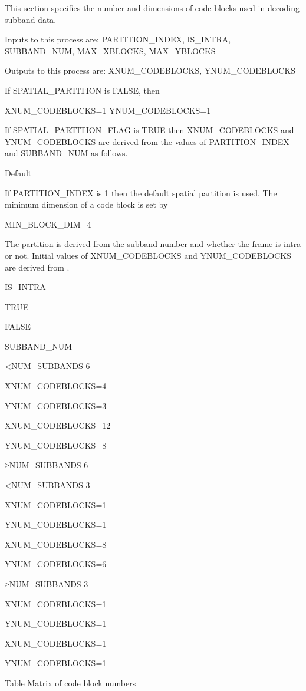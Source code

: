 This section specifies the number and dimensions of code blocks used in
decoding subband data.

Inputs to this process are: PARTITION\_INDEX, IS\_INTRA, SUBBAND\_NUM,
MAX\_XBLOCKS, MAX\_YBLOCKS

Outputs to this process are: XNUM\_CODEBLOCKS, YNUM\_CODEBLOCKS

If SPATIAL\_PARTITION is FALSE, then

XNUM\_CODEBLOCKS=1
YNUM\_CODEBLOCKS=1

If SPATIAL\_PARTITION\_FLAG is TRUE then XNUM\_CODEBLOCKS and
YNUM\_CODEBLOCKS are derived from the values of PARTITION\_INDEX and
SUBBAND\_NUM as follows.

Default

If PARTITION\_INDEX is 1 then the default spatial partition is used. The
minimum dimension of a code block is set by

MIN\_BLOCK\_DIM=4

The partition is derived from the subband number and whether the frame
is intra or not. Initial values of XNUM\_CODEBLOCKS and YNUM\_CODEBLOCKS
are derived from .




IS\_INTRA



TRUE

FALSE

SUBBAND\_NUM

<NUM\_SUBBANDS-6

XNUM\_CODEBLOCKS=4

YNUM\_CODEBLOCKS=3

XNUM\_CODEBLOCKS=12

YNUM\_CODEBLOCKS=8



≥NUM\_SUBBANDS-6

<NUM\_SUBBANDS-3

XNUM\_CODEBLOCKS=1

YNUM\_CODEBLOCKS=1

XNUM\_CODEBLOCKS=8

YNUM\_CODEBLOCKS=6



≥NUM\_SUBBANDS-3

XNUM\_CODEBLOCKS=1

YNUM\_CODEBLOCKS=1

XNUM\_CODEBLOCKS=1

YNUM\_CODEBLOCKS=1


Table   Matrix of code block numbers

